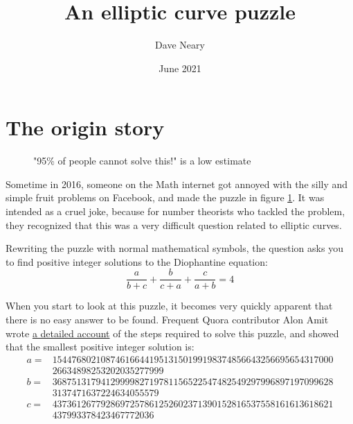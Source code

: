 \documentclass{article}
\title{An elliptic curve puzzle}
\author{Dave Neary}
\date{June 2021}
\begin{document}
\maketitle

\section{The origin story}

\begin{figure}[htb]
        \caption{"95\% of people cannot solve this!" is a low estimate}
	\label{fig:puzzle}
\end{figure}

Sometime in 2016, someone on the Math internet got annoyed with the silly and simple fruit problems on
Facebook, and made the puzzle in figure \ref{fig:puzzle}. It was intended as a cruel joke, because for
number theorists who tackled the problem, they recognized that this was a very difficult question
related to elliptic curves.

Rewriting the puzzle with normal mathematical symbols, the question asks you to find positive integer
solutions to the Diophantine equation:
\[ \frac{a}{b+c} + \frac{b}{c+a} + \frac{c}{a+b} = 4 \]

When you start to look at this puzzle, it becomes very quickly apparent that there is no easy answer to be
found. Frequent Quora contributor Alon Amit wrote
\href{https://www.quora.com/How-do-you-find-the-positive-integer-solutions-to-frac-x-y+z-+-frac-y-z+x-+-frac-z-x+y-4/answer/Alon-Amit}{a detailed account}
of the steps required to solve this puzzle, and showed that the smallest positive integer solution is:
\begin{equation*}
	\begin{split}
		a = &1544768021087461664419513150199198374856643256695654317000\\ &26634898253202035277999 \\
		b = &3687513179412999982719781156522547482549297996897197099628\\ &3137471637224634055579 \\
		c = &4373612677928697257861252602371390152816537558161613618621\\ &437993378423467772036
	\end{split}
\end{equation*}
\end{document}
